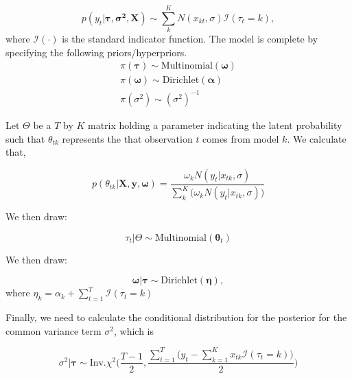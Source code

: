 \documentclass[xcolor=dvipsnames]{beamer}
\begin{document}
\begin{frame}
\begin{equation}p(y_{t}|\boldsymbol{\tau}, \boldsymbol{\sigma^2}, \mathbf{X}) \sim \sum_k^K N(x_{kt}, \sigma)\mathcal{I}(\tau_t=k),\end{equation} where $\mathcal{I}(\cdot)$ is the standard indicator function. The model is complete by specifying the following priors/hyperpriors.
\begin{gather}
\pi(\boldsymbol{\tau}) \sim \mbox{Multinomial}(\boldsymbol{\omega})\\
\pi(\boldsymbol{\omega}) \sim \mbox{Dirichlet}(\boldsymbol{\alpha})\\
\pi(\sigma^2) \sim (\sigma^2)^{-1} 
\end{gather}



\end{frame}



\begin{frame}



Let $\Theta$ be a $T$ by $K$ matrix holding a parameter indicating the latent probability such that $\theta_{tk}$ represents the that observation $t$ comes from model $k$. We calculate that, 

\begin{equation}
p(\theta_{tk} |\mathbf{X}, \mathbf{y}, \boldsymbol{\omega}) = \frac{\omega_kN(y_t|x_{tk}, \sigma)}{\sum_k^K\big(\omega_k N(y_t|x_{tk}, \sigma)\big)} 
\end{equation}

We then draw:

\begin{equation}
\tau_t |\Theta \sim \mbox{Multinomial}(\boldsymbol{\theta}_t)
\end{equation}

We then draw:

\begin{equation}
\boldsymbol{\omega}| \mathbf{\tau} \sim \mbox{Dirichlet}(\boldsymbol{\eta}),
\end{equation}
where $\eta_k=\alpha_k + \sum_{t=1}^T \mathcal{I}(\tau_t=k)$

\end{frame}

\begin{frame}

Finally, we need to calculate the conditional distribution for the posterior for the common variance term $\sigma^2$, which is

\begin{equation}\sigma^2 | \boldsymbol{\tau} \sim \mbox{Inv}.\chi^2\Big(\frac{T-1}{2}, \frac{\sum_{t=1}^T\big(y_t - \sum_{k=1}^K x_{tk}\mathcal{I}(\tau_t = k)\big) }{2}\Big)
\end{equation}

\end{frame}
\end{document}

